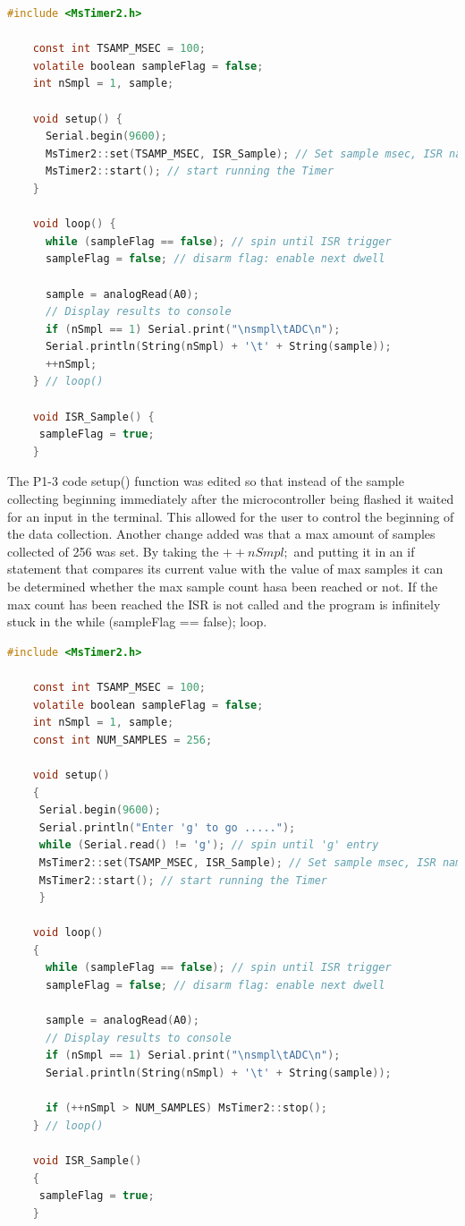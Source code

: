 \documentclass[journal]{IEEEtran}
\begin{document}
\begin{lstlisting}[language=c]
    #include <MsTimer2.h>

    const int TSAMP_MSEC = 100;
    volatile boolean sampleFlag = false;
    int nSmpl = 1, sample;
    
    void setup() {
      Serial.begin(9600);
      MsTimer2::set(TSAMP_MSEC, ISR_Sample); // Set sample msec, ISR name
      MsTimer2::start(); // start running the Timer
    }

    void loop() {
      while (sampleFlag == false); // spin until ISR trigger
      sampleFlag = false; // disarm flag: enable next dwell
      
      sample = analogRead(A0);
      // Display results to console
      if (nSmpl == 1) Serial.print("\nsmpl\tADC\n");
      Serial.println(String(nSmpl) + '\t' + String(sample));
      ++nSmpl;
    } // loop()

    void ISR_Sample() {
     sampleFlag = true;
    }
\end{lstlisting}

The P1-3 code setup() function was edited so that instead of the sample collecting beginning immediately after the microcontroller being flashed it waited for an input in the terminal. This allowed for the user to control the beginning of the data collection. Another change added was that a max amount of samples collected of 256 was set. By taking the $++nSmpl;$ and putting it in an if statement that compares its current value with the value of max samples it can be determined whether the max sample count hasa been reached or not. If the max count has been reached the ISR is not called and the program is infinitely stuck in the while (sampleFlag == false); loop.

\begin{lstlisting}[language=c]
    #include <MsTimer2.h>

    const int TSAMP_MSEC = 100;
    volatile boolean sampleFlag = false;
    int nSmpl = 1, sample;
    const int NUM_SAMPLES = 256;
    
    void setup()
    {
     Serial.begin(9600);
     Serial.println("Enter 'g' to go .....");
     while (Serial.read() != 'g'); // spin until 'g' entry
     MsTimer2::set(TSAMP_MSEC, ISR_Sample); // Set sample msec, ISR name
     MsTimer2::start(); // start running the Timer
     }
    
    void loop()
    {
      while (sampleFlag == false); // spin until ISR trigger
      sampleFlag = false; // disarm flag: enable next dwell
      
      sample = analogRead(A0);
      // Display results to console
      if (nSmpl == 1) Serial.print("\nsmpl\tADC\n");
      Serial.println(String(nSmpl) + '\t' + String(sample));
      
      if (++nSmpl > NUM_SAMPLES) MsTimer2::stop();
    } // loop()
    
    void ISR_Sample()
    {
     sampleFlag = true;
    }
\end{lstlisting}
\end{document}
